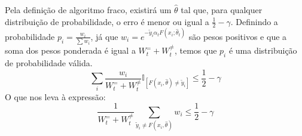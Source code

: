 Pela definição de algoritmo fraco, existirá um $\hat{\theta}$ tal que, para qualquer distribuição de probabilidade, o erro é menor ou igual a $\frac{1}{2} - \gamma$.
Definindo a probabilidade $p_i = \frac{w_i}{\sum w_i}$, já que $w_i = e^{-\tilde{y}_i \hat{\alpha}_t F(x_i; \hat{\theta}_t)}$ são pesos positivos e que a
soma dos pesos ponderada é igual a $W_t^{=} + W_t^{\neq}$, temos que $p_i$ é uma distribuição de probabilidade válida.
\begin{equation*}
    \sum_{i} \frac{w_i}{W_t^{=} + W_t^{\neq}} \mathbb{I}_{[F(x_i, \hat{\theta}) \neq \tilde{y}_i]} \le \frac{1}{2} - \gamma
\end{equation*}
O que nos leva à expressão:
\begin{equation*}
    \frac{1}{W_t^{=} + W_t^{\neq}} \sum_{\tilde{y}_i \neq F(x_i, \hat{\theta})} w_i \le \frac{1}{2} - \gamma
\end{equation*}

